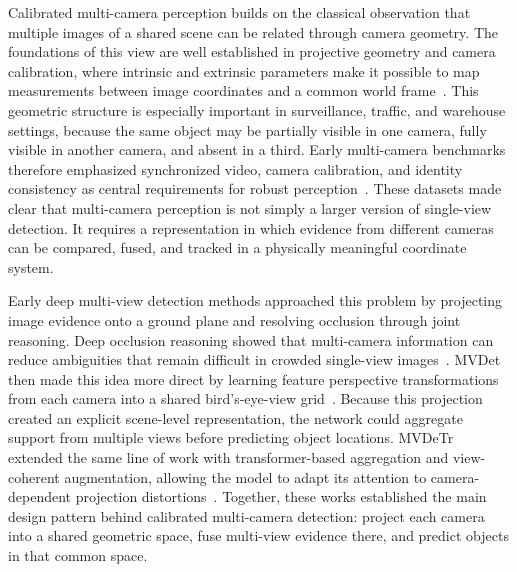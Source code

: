 \documentclass[runningheads]{llncs}
\begin{document}
Calibrated multi-camera perception builds on the classical observation that
multiple images of a shared scene can be related through camera geometry. The
foundations of this view are well established in projective geometry and camera
calibration, where intrinsic and extrinsic parameters make it possible to map
measurements between image coordinates and a common world frame~\cite{hartley2004multiple,
zhang2000calibration}. This geometric structure is especially important in
surveillance, traffic, and warehouse settings, because the same object may be
partially visible in one camera, fully visible in another camera, and absent in a
third. Early multi-camera benchmarks therefore emphasized synchronized video,
camera calibration, and identity consistency as central requirements for robust
perception~\cite{ristani2016dukemtmc,chavdarova2018wildtrack,tang2019cityflow}.
These datasets made clear that multi-camera perception is not simply a larger
version of single-view detection. It requires a representation in which evidence
from different cameras can be compared, fused, and tracked in a physically
meaningful coordinate system.

Early deep multi-view detection methods approached this problem by projecting
image evidence onto a ground plane and resolving occlusion through joint reasoning.
Deep occlusion reasoning showed that multi-camera information can reduce
ambiguities that remain difficult in crowded single-view images~\cite{baque2017deepocclusion}.
MVDet then made this idea more direct by learning feature perspective
transformations from each camera into a shared bird's-eye-view grid~\cite{hou2020mvdet}.
Because this projection created an explicit scene-level representation, the
network could aggregate support from multiple views before predicting object
locations. MVDeTr extended the same line of work with transformer-based
aggregation and view-coherent augmentation, allowing the model to adapt its
attention to camera-dependent projection distortions~\cite{hou2021mvdetr}.
Together, these works established the main design pattern behind calibrated
multi-camera detection: project each camera into a shared geometric space, fuse
multi-view evidence there, and predict objects in that common space.
\end{document}
